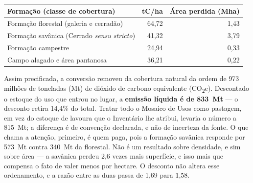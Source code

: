 \begin{quadro}[htb]
\centering
\caption[Densidades de carbono adotadas por formação]{Densidades de carbono adotadas por formação (decisão D30).}
\label{quadro:densidades}
\small
\begin{tabular}{lrr}
\toprule
\textbf{Formação (classe de cobertura)} & \textbf{tC/ha} & \textbf{Área perdida (Mha)} \\
\midrule
Formação florestal (galeria e cerradão) & 64,72 & 1,43 \\
Formação savânica (Cerrado \emph{sensu stricto}) & 41,32 & 3,79 \\
Formação campestre & 24,94 & 0,33 \\
Campo alagado e área pantanosa & 36,21 & 0,22 \\
\bottomrule
\end{tabular}
\end{quadro}

Assim precificada, a conversão removeu da cobertura natural da ordem de 973
milhões de toneladas (Mt) de dióxido de carbono equivalente
(CO\textsubscript{2}e). Descontado o
estoque do uso que entrou no lugar, a \textbf{emissão líquida é de 833~Mt} --- o
desconto retira 14,4\% do total. Tratar todo o Mosaico de Usos como pastagem,
em vez do estoque de lavoura que o Inventário lhe atribui, levaria o número a
815~Mt; a diferença é de convenção declarada, e não de incerteza da fonte. O
que chama a atenção, primeiro, é quem paga, pois a formação savânica responde por
573~Mt contra 340~Mt da florestal. Não é um resultado sobre densidade, e sim
sobre área --- a savânica perdeu 2,6 vezes mais superfície, e isso mais que
compensa o fato de valer menos por hectare. O desconto não altera esse
ordenamento, e a razão entre as duas passa de 1,69 para 1,58.

